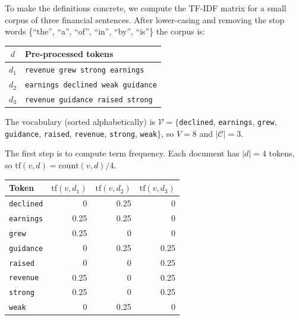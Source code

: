 \begin{deepdive}
\begin{example}
\label{ex:tfidf-example}
To make the definitions concrete, we compute the TF-IDF matrix for a small corpus of
three financial sentences.  After lower-casing and removing the stop words \{``the'',
``a'', ``of'', ``in'', ``by'', ``is''\} the corpus is:

\medskip
\begin{center}
\begin{tabular}{cl}
\toprule
$d$ & Pre-processed tokens \\
\midrule
$d_1$ & \texttt{revenue grew strong earnings} \\
$d_2$ & \texttt{earnings declined weak guidance} \\
$d_3$ & \texttt{revenue guidance raised strong} \\
\bottomrule
\end{tabular}
\end{center}
\medskip

The vocabulary (sorted alphabetically) is
$\mathcal{V} = \{$\texttt{declined}, \texttt{earnings}, \texttt{grew}, \texttt{guidance},
\texttt{raised}, \texttt{revenue}, \texttt{strong}, \texttt{weak}$\}$, so $V = 8$ and
$|\mathcal{C}| = 3$.

The first step is to compute term frequency. Each document has $|d| = 4$ tokens, so $\mathrm{tf}(v, d) = \mathrm{count}(v, d) / 4$.

\medskip
\begin{center}
\begin{tabular}{lrrr}
\toprule
Token & $\mathrm{tf}(v, d_1)$ & $\mathrm{tf}(v, d_2)$ & $\mathrm{tf}(v, d_3)$ \\
\midrule
\texttt{declined} & 0       & 0.25    & 0 \\
\texttt{earnings} & 0.25    & 0.25    & 0 \\
\texttt{grew}     & 0.25    & 0       & 0 \\
\texttt{guidance} & 0       & 0.25    & 0.25 \\
\texttt{raised}   & 0       & 0       & 0.25 \\
\texttt{revenue}  & 0.25    & 0       & 0.25 \\
\texttt{strong}   & 0.25    & 0       & 0.25 \\
\texttt{weak}     & 0       & 0.25    & 0 \\
\bottomrule
\end{tabular}
\end{center}


\end{example}
\end{deepdive}
